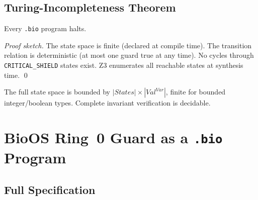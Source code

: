\documentclass[11pt,a4paper,twoside]{article}
\newcommand{\tm}[1]{\texttt{#1}}
\begin{document}
\subsection{Turing-Incompleteness Theorem}

\begin{theorem}[Termination]\label{thm:termination}
Every \texttt{.bio} program halts.
\end{theorem}
\begin{proof}[Proof sketch]
The state space is finite (declared at compile time). The transition relation is
deterministic (at most one guard true at any time). No cycles through
\tm{CRITICAL\_SHIELD} states exist. Z3 enumerates all reachable states at
synthesis time. \qed
\end{proof}

\begin{corollary}
The full state space is bounded by $|\textit{States}|\times|\textit{Val}^{\textit{Var}}|$,
finite for bounded integer/boolean types. Complete invariant verification is decidable.
\end{corollary}

\section{BioOS Ring~0 Guard as a \texttt{.bio} Program}

\subsection{Full Specification}
\end{document}
